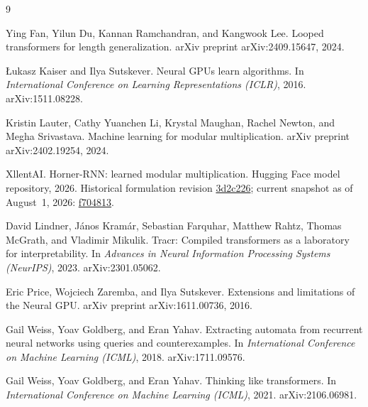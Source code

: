 \documentclass[11pt]{article}
\begin{document}
\begin{thebibliography}{9}

Ying Fan, Yilun Du, Kannan Ramchandran, and Kangwook Lee.
\newblock Looped transformers for length generalization.
\newblock arXiv preprint arXiv:2409.15647, 2024.

\L{}ukasz Kaiser and Ilya Sutskever.
\newblock Neural {GPU}s learn algorithms.
\newblock In \emph{International Conference on Learning Representations (ICLR)}, 2016.
 arXiv:1511.08228.

Kristin Lauter, Cathy Yuanchen Li, Krystal Maughan, Rachel Newton, and Megha Srivastava.
\newblock Machine learning for modular multiplication.
\newblock arXiv preprint arXiv:2402.19254, 2024.

XllentAI.
\newblock Horner-RNN: learned modular multiplication.
\newblock Hugging Face model repository, 2026. Historical formulation revision
\href{https://huggingface.co/XllentAI/modular_arithmetic/tree/3d2c226c2382140b890026bdfdd59485daa192ba}{3d2c226};
current snapshot as of August~1, 2026:
\href{https://huggingface.co/XllentAI/modular_arithmetic/tree/f704813dc64d7c04cc9ba7dbf9a3a281c431628d}{f704813}.

David Lindner, J\'anos Kram\'ar, Sebastian Farquhar, Matthew Rahtz, Thomas McGrath,
 and Vladimir Mikulik.
\newblock Tracr: Compiled transformers as a laboratory for interpretability.
\newblock In \emph{Advances in Neural Information Processing Systems (NeurIPS)}, 2023.
 arXiv:2301.05062.

Eric Price, Wojciech Zaremba, and Ilya Sutskever.
\newblock Extensions and limitations of the {N}eural {GPU}.
\newblock arXiv preprint arXiv:1611.00736, 2016.

Gail Weiss, Yoav Goldberg, and Eran Yahav.
\newblock Extracting automata from recurrent neural networks using queries and
 counterexamples.
\newblock In \emph{International Conference on Machine Learning (ICML)}, 2018.
 arXiv:1711.09576.

Gail Weiss, Yoav Goldberg, and Eran Yahav.
\newblock Thinking like transformers.
\newblock In \emph{International Conference on Machine Learning (ICML)}, 2021.
 arXiv:2106.06981.


\end{thebibliography}
\end{document}

